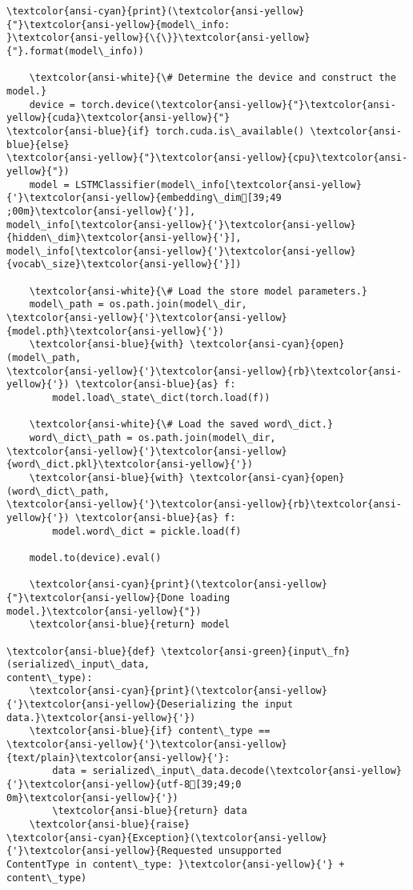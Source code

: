 \documentclass[11pt]{article}
\begin{document}
\begin{Verbatim}[commandchars=\\\{\}]
    \textcolor{ansi-cyan}{print}(\textcolor{ansi-yellow}{"}\textcolor{ansi-yellow}{model\_info:
}\textcolor{ansi-yellow}{\{\}}\textcolor{ansi-yellow}{"}.format(model\_info))

    \textcolor{ansi-white}{\# Determine the device and construct the model.}
    device = torch.device(\textcolor{ansi-yellow}{"}\textcolor{ansi-yellow}{cuda}\textcolor{ansi-yellow}{"}
\textcolor{ansi-blue}{if} torch.cuda.is\_available() \textcolor{ansi-blue}{else}
\textcolor{ansi-yellow}{"}\textcolor{ansi-yellow}{cpu}\textcolor{ansi-yellow}{"})
    model = LSTMClassifier(model\_info[\textcolor{ansi-yellow}{'}\textcolor{ansi-yellow}{embedding\_dim[39;49
;00m}\textcolor{ansi-yellow}{'}],
model\_info[\textcolor{ansi-yellow}{'}\textcolor{ansi-yellow}{hidden\_dim}\textcolor{ansi-yellow}{'}],
model\_info[\textcolor{ansi-yellow}{'}\textcolor{ansi-yellow}{vocab\_size}\textcolor{ansi-yellow}{'}])

    \textcolor{ansi-white}{\# Load the store model parameters.}
    model\_path = os.path.join(model\_dir,
\textcolor{ansi-yellow}{'}\textcolor{ansi-yellow}{model.pth}\textcolor{ansi-yellow}{'})
    \textcolor{ansi-blue}{with} \textcolor{ansi-cyan}{open}(model\_path,
\textcolor{ansi-yellow}{'}\textcolor{ansi-yellow}{rb}\textcolor{ansi-yellow}{'}) \textcolor{ansi-blue}{as} f:
        model.load\_state\_dict(torch.load(f))

    \textcolor{ansi-white}{\# Load the saved word\_dict.}
    word\_dict\_path = os.path.join(model\_dir,
\textcolor{ansi-yellow}{'}\textcolor{ansi-yellow}{word\_dict.pkl}\textcolor{ansi-yellow}{'})
    \textcolor{ansi-blue}{with} \textcolor{ansi-cyan}{open}(word\_dict\_path,
\textcolor{ansi-yellow}{'}\textcolor{ansi-yellow}{rb}\textcolor{ansi-yellow}{'}) \textcolor{ansi-blue}{as} f:
        model.word\_dict = pickle.load(f)

    model.to(device).eval()

    \textcolor{ansi-cyan}{print}(\textcolor{ansi-yellow}{"}\textcolor{ansi-yellow}{Done loading
model.}\textcolor{ansi-yellow}{"})
    \textcolor{ansi-blue}{return} model

\textcolor{ansi-blue}{def} \textcolor{ansi-green}{input\_fn}(serialized\_input\_data,
content\_type):
    \textcolor{ansi-cyan}{print}(\textcolor{ansi-yellow}{'}\textcolor{ansi-yellow}{Deserializing the input
data.}\textcolor{ansi-yellow}{'})
    \textcolor{ansi-blue}{if} content\_type ==
\textcolor{ansi-yellow}{'}\textcolor{ansi-yellow}{text/plain}\textcolor{ansi-yellow}{'}:
        data = serialized\_input\_data.decode(\textcolor{ansi-yellow}{'}\textcolor{ansi-yellow}{utf-8[39;49;0
0m}\textcolor{ansi-yellow}{'})
        \textcolor{ansi-blue}{return} data
    \textcolor{ansi-blue}{raise}
\textcolor{ansi-cyan}{Exception}(\textcolor{ansi-yellow}{'}\textcolor{ansi-yellow}{Requested unsupported
ContentType in content\_type: }\textcolor{ansi-yellow}{'} + content\_type)


\end{Verbatim}
\end{document}
